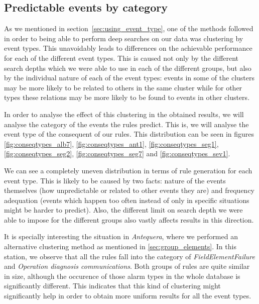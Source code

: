 \documentclass[a4paper,12pt]{article}
\begin{document}
\subsection{Predictable events by category}
As we mentioned in section~\ref{sec:using_event_type}, one of the methods followed in order to being able to perform deep searches on our data was clustering by event types. This unavoidably leads to differences on the achievable performance for each of the different event types. This is caused not only by the different search depths which we were able to use in each of the different groups, but also by the individual nature of each of the event types: events in some of the clusters may be more likely to be related to others in the same cluster while for other types these relations may be more likely to be found to events in other clusters. 

In order to analyse the effect of this clustering in the obtained results, we will analyse the category of the events the rules predict. This is, we will analyse the event type of the consequent of our rules. This distribution can be seen in figures \ref{fig:conseqtypes_alb7}, \ref{fig:conseqtypes_ant1}, \ref{fig:conseqtypes_seg1}, \ref{fig:conseqtypes_seg2}, \ref{fig:conseqtypes_seg7} and \ref{fig:conseqtypes_sev1}.

We can see a completely uneven distribution in terms of rule generation for each event type. This is likely to be caused by two facts: nature of the events themselves (how unpredictable or related to other events they are) and frequency adequation (events which happen too often instead of only in specific situations might be harder to predict). Also, the different limit on search depth we were able to impose for the different groups also vastly affects results in this direction.

It is specially interesting the situation in \emph{Antequera}, where we performed an alternative clustering method as mentioned in \ref{sec:group_elements}. In this station, we observe that all the rules fall into the category of \emph{FieldElementFailure} and \emph{Operation diagnosis communications}. Both groups of rules are quite similar in size, although the occurence of those alarm types in the whole database is significantly different. This indicates that this kind of clustering might significantly help in order to obtain more uniform results for all the event types.
\end{document}
